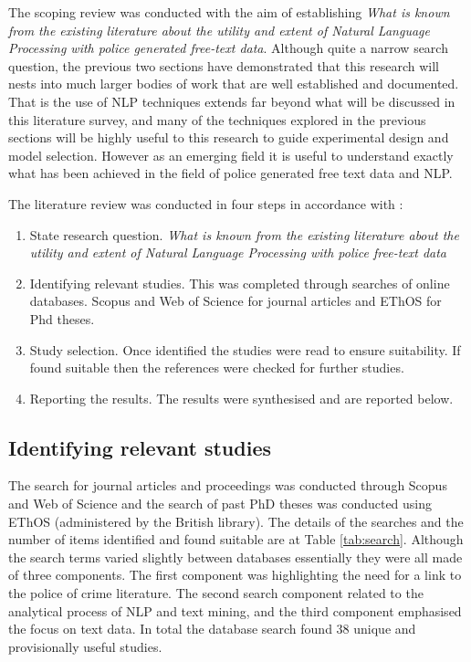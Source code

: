 The scoping review was conducted with the aim of establishing \emph{What is known from the existing literature about the utility and extent of Natural Language Processing with police generated free-text data}. Although quite a narrow search question, the previous two sections have demonstrated that this research will nests into much larger bodies of work that are well established and documented. That is the use of NLP techniques extends far beyond what will be discussed in this literature survey, and many of the techniques explored in the previous sections will be highly useful to this research to guide experimental design and model selection. However as an emerging field it is useful to understand exactly what has been achieved in the field of police generated free text data and NLP. 


The literature review was conducted in four steps in accordance with \textcite{arksey2005scoping}:

\begin{enumerate}

\item State research question. \emph{What is known from the existing literature about the utility and extent of Natural Language Processing with police free-text data}
\item Identifying relevant studies. This was completed through searches of online databases. Scopus and Web of Science for journal articles and EThOS for Phd theses.

\item Study selection. Once identified the studies were read to ensure suitability. If found suitable then the references were checked for further studies.

\item Reporting the results. The results were synthesised and are reported below.


\end{enumerate}


\subsection{Identifying relevant studies}

The search for journal articles and proceedings was conducted through Scopus and Web of Science and the search of past PhD theses was conducted using EThOS (administered by the British library). The details of the searches and the number of items identified and found suitable are at Table \ref{tab:search}. Although the search terms varied slightly between databases essentially they were all made of three components. The first component was highlighting the need for a link to the police of crime literature. The second search component related to the analytical process of NLP and text mining, and the third component emphasised the focus on text data. In total the database search found 38 unique and provisionally useful studies.

